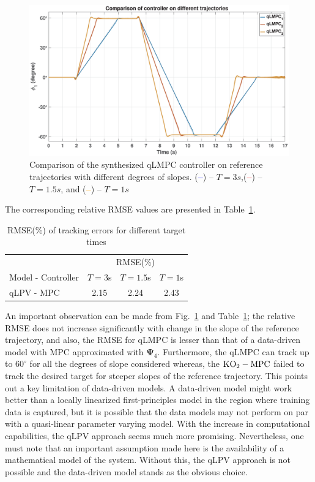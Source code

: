 \begin{figure}[H]
    \centering
    \includegraphics[width=1\linewidth]{figures/qLMPC_comp}
    \caption{Comparison of the synthesized qLMPC controller on reference trajectories with different degrees of slopes. (\textcolor{blue}{\textbf{--}}) -- $T = 3s$,(\textcolor{red}{\textbf{--}}) -- $T = 1.5s$, and (\textcolor{orange}{\textbf{--}}) -- $T = 1s$}
    \label{fig: cont_traj_qLMPC}
\end{figure}
% 
The corresponding relative RMSE values are presented in Table~\ref{tab:RMSE_diffslopes_qlmpc}.
\begin{table}[H]
    \centering
    \begin{tabular}{lccc}
         \toprule
                                            & \multicolumn{3}{c}{RMSE(\%)}\\
        \cmidrule{2-4}
         Model - Controller                  & $T = 3$s & $T = 1.5$s & $T = 1$s \\
         \midrule
         qLPV - MPC                         & 2.15       & 2.24     & 2.43\\
         \bottomrule
    \end{tabular}
    \caption{RMSE(\%) of tracking errors for different target times}
    \label{tab:RMSE_diffslopes_qlmpc}
\end{table}
% 
An important observation can be made from Fig.~\ref{fig: cont_traj_qLMPC} and Table~\ref{tab:RMSE_diffslopes_qlmpc}; the relative RMSE does not increase significantly with change in the slope of the reference trajectory, and also, the RMSE for qLMPC is lesser than that of a data-driven model with MPC approximated with $\mathbf{\Psi}_4$. Furthermore, the qLMPC can track up to $60^\circ$ for all the degrees of slope considered whereas, the $\textup{KO}_2-\textup{MPC}$ failed to track the desired target for steeper slopes of the reference trajectory. This points out a key limitation of data-driven models. A data-driven model might work better than a locally linearized first-principles model in the region where training data is captured, but it is possible that the data models may not perform on par with a quasi-linear parameter varying model. With the increase in computational capabilities, the qLPV approach seems much more promising. Nevertheless, one must note that an important assumption made here is the availability of a mathematical model of the system. Without this, the qLPV approach is not possible and the data-driven model stands as the obvious choice. \par
